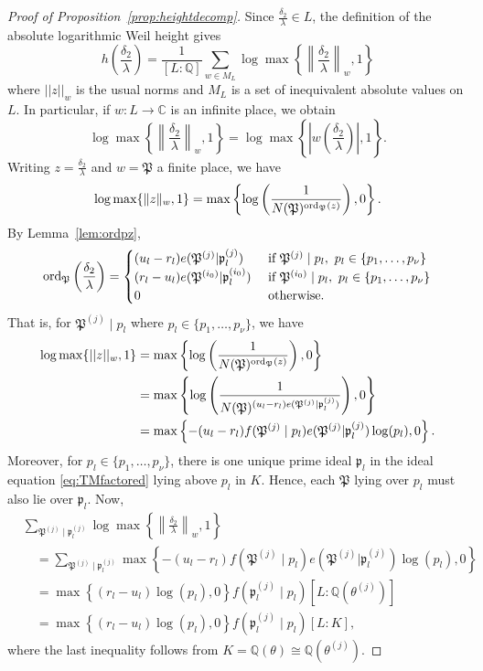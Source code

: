 \begin{proof}[Proof of Proposition~\ref{prop:heightdecomp}]Since $\frac{\delta_2}{\lambda} \in L$, the definition of the absolute logarithmic Weil height gives
\[h\left(\frac{\delta_2}{\lambda}\right)=\frac{1}{[L:\mathbb{Q}]}\sum_{w \in M_L} \log \max \left\{ \left\|\frac{\delta_2}{\lambda}\right\|_{w}, 1\right\}\]
where $||z||_w$ is the usual norms and $M_L$ is a set of inequivalent absolute values on $L$. In particular, if $w: L \to \mathbb{C}$ is an infinite place, we obtain
\[ \log \max \left\{ \left\|\frac{\delta_2}{\lambda}\right\|_{w}, 1\right\} = \log \max \left\{ \left|w\left(\frac{\delta_2}{\lambda}\right)\right|, 1\right\}.\]
Writing $z = \frac{\delta_2}{\lambda}$ and $w = \mathfrak{P}$ a finite place, we have
\[ \log \max \{ \|z\|_{w}, 1\} = \max \left\{ \log\left(\frac{1}{N(\mathfrak{P})^{\operatorname{ord}_{\mathfrak{P}}(z)}} \right), 0\right\}. \]
By Lemma~\ref{lem:ordpz}, 
\[\operatorname{ord}_{\mathfrak{P}}\left( \frac{\delta_2}{\lambda}\right)=
\begin{cases}
(u_l - r_l)e(\mathfrak{P}^{(j)}|\mathfrak{p}_l^{(j)})	
	& \textnormal{ if } \mathfrak{P}^{(j)} \mid p_l , \ p_l \in \{p_1,\dots, p_{\nu}\}\\
(r_l - u_l)e(\mathfrak{P}^{(i_0)}|\mathfrak{p}_l^{(i_0)})
	& \textnormal{ if } \mathfrak{P}^{(i_0)}\mid p_l, \ p_l \in \{p_1,\dots, p_{\nu}\}\\
0 	& \textnormal{ otherwise}.
\end{cases}\]
That is, for $\mathfrak{P}^{(j)}\mid p_l$ where $p_l \in \{p_1, \dots, p_{\nu}\}$, we have
\begin{align*}
 \log \max \{ ||z||_{w}, 1\}	
 	& = \max \left\{ \log\left(\frac{1}{N(\mathfrak{P})^{\operatorname{ord}_{\mathfrak{P}}(z)}} \right), 0\right\}\\
	& = \max \left\{ \log\left(\frac{1}{N(\mathfrak{P})^{(u_l - r_l)e(\mathfrak{P}^{(j)}|\mathfrak{p}_l^{(j)})}} \right), 0\right\}\\
	& = \max \left\{ -(u_l - r_l)f(\mathfrak{P}^{(j)}\mid p_l)e(\mathfrak{P}^{(j)}|\mathfrak{p}_l^{(j)})\log(p_l), 0\right\}.
\end{align*}
Moreover, for $p_l \in \{p_1, \dots, p_{\nu}\}$, there is one unique prime ideal $\mathfrak{p}_l$ in the ideal equation \eqref{eq:TMfactored} lying above $p_l$ in $K$. Hence, each $\mathfrak{P}$ lying over $p_l$ must also lie over $\mathfrak{p}_l$. Now, 
\begin{align*}
& \sum_{\mathfrak{P}^{(j)} \mid \mathfrak{p}_l^{(j)}} \log \max \left\{ \left\|\frac{\delta_2}{\lambda}\right\|_{w}, 1\right\} \\
	& \quad = \sum_{\mathfrak{P}^{(j)} \mid \mathfrak{p}_l^{(j)}} \max \left\{ -(u_l - r_l)f(\mathfrak{P}^{(j)}\mid p_l)e(\mathfrak{P}^{(j)}|\mathfrak{p}_l^{(j)})\log(p_l), 0\right\}\\
	& \quad = \max \left\{ (r_l - u_l)\log(p_l), 0\right\}f(\mathfrak{p}_l^{(j)}\mid p_l)[L:\mathbb{Q}(\theta^{(j)})]\\
	& \quad = \max \left\{ (r_l - u_l)\log(p_l), 0\right\}f(\mathfrak{p}_l^{(j)}\mid p_l)[L:K],
\end{align*}
where the last inequality follows from $K = \mathbb{Q}(\theta) \cong \mathbb{Q}(\theta^{(j)})$.


\end{proof}

